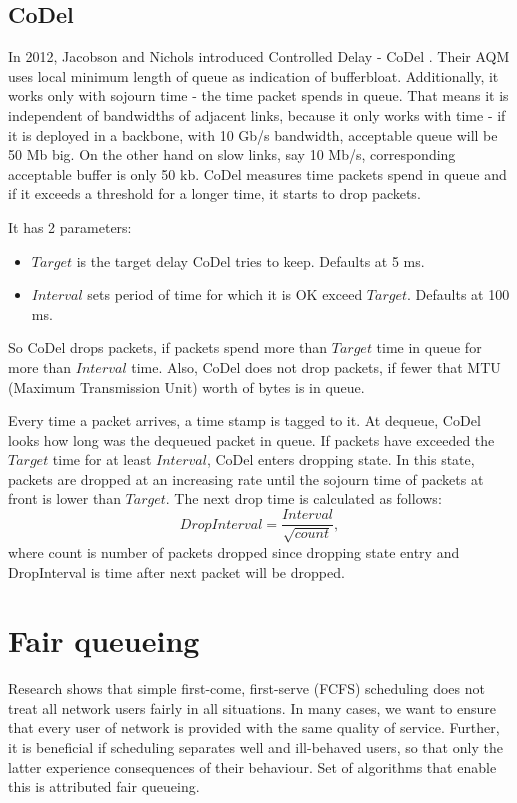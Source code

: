\subsection{CoDel}

In 2012, Jacobson and Nichols introduced Controlled Delay - CoDel \cite{CoDel}. Their AQM uses local minimum length of queue as indication of bufferbloat. Additionally, it works only with sojourn time - the time packet spends in queue. That means it is independent of bandwidths of adjacent links, because it only works with time - if it is deployed in a backbone, with 10 Gb/s bandwidth, acceptable queue will be 50 Mb big. On the other hand on slow links, say 10 Mb/s, corresponding acceptable buffer is only 50 kb. CoDel measures time packets spend in queue and if it exceeds a threshold for a longer time, it starts to drop packets.

It has 2 parameters:
\begin{itemize}
	\item $Target$ is the target delay CoDel tries to keep. Defaults at 5 ms.
	\item $Interval$ sets period of time for which it is OK exceed $Target$. Defaults at 100 ms.
\end{itemize}
So CoDel drops packets, if packets spend more than $Target$ time in queue for more than $Interval$ time. Also, CoDel does not drop packets, if fewer that MTU (Maximum Transmission Unit) worth of bytes is in queue.

Every time a packet arrives, a time stamp is tagged to it. At dequeue, CoDel looks how long was the dequeued packet in queue. If packets have exceeded the $Target$ time for at least $Interval$, CoDel enters dropping state. In this state, packets are dropped at an increasing rate until the sojourn time of packets at front is lower than $Target$. The next drop time is calculated as follows:
\[
  DropInterval = \frac{Interval}{\sqrt{count}},
\]
where count is number of packets dropped since dropping state entry and DropInterval is time after next packet will be dropped.


\section{Fair queueing}

Research shows that simple first-come, first-serve (FCFS) scheduling does not treat all network users fairly in all situations. In many cases, we want to ensure that every user of network is provided with the same quality of service. Further, it is beneficial if scheduling separates well and ill-behaved users, so that only the latter experience consequences of their behaviour. Set of algorithms that enable this is attributed fair queueing.

